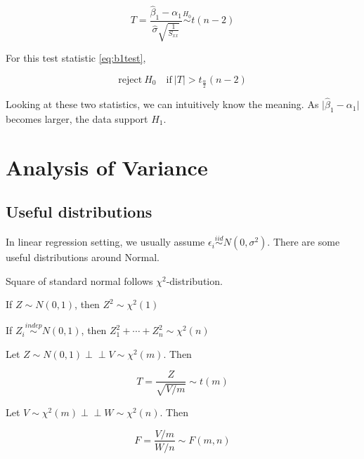 \documentclass[]{book}
\theoremstyle{definition}
\theoremstyle{definition}
\theoremstyle{definition}
\theoremstyle{remark}
\let\BeginKnitrBlock\begin \let\EndKnitrBlock\end
\begin{document}
\begin{equation}
  T = \frac{\hat\beta_1 - \alpha_1}{\hat\sigma \sqrt{\frac{1}{S_{xx}}}} \stackrel{H_0}{\sim} t(n - 2)
  \label{eq:b1test}
\end{equation}

For this test statistic \eqref{eq:b1test},

\[\text{reject}\: H_0 \quad \text{if} \: \lvert T \rvert > t_{\frac{\alpha}{2}}(n - 2)\]

Looking at these two statistics, we can intuitively know the meaning. As \(\lvert \hat\beta_1 - \alpha_1 \rvert\) becomes larger, the data support \(H_1\).

\hypertarget{analysis-of-variance}{%
\section{Analysis of Variance}\label{analysis-of-variance}}

\hypertarget{useful-distributions}{%
\subsection{Useful distributions}\label{useful-distributions}}

In linear regression setting, we usually assume \(\epsilon_i \stackrel{iid}{\sim}N(0, \sigma^2)\). There are some useful distributions around Normal.

\BeginKnitrBlock{proposition}[$\chi^2$-distribution]
\protect\hypertarget{prp:chisq}{}{\label{prp:chisq} {} }Square of standard normal follows \(\chi^2\)-distribution.

If \(Z \sim N(0, 1)\), then \(Z^2 \sim \chi^2(1)\)

If \(Z_i \stackrel{indep}{\sim}N(0, 1)\), then \(Z_1^2 + \cdots + Z_n^2 \sim \chi^2(n)\)
\EndKnitrBlock{proposition}

\BeginKnitrBlock{proposition}[t-distribution]
\protect\hypertarget{prp:tdist}{}{\label{prp:tdist} {} }Let \(Z \sim N(0, 1) \perp\!\!\!\perp V \sim \chi^2(m)\). Then

\[T = \frac{Z}{\sqrt{V / m}} \sim t(m)\]
\EndKnitrBlock{proposition}

\BeginKnitrBlock{proposition}[F-distribution]
\protect\hypertarget{prp:fdist}{}{\label{prp:fdist} {} }Let \(V \sim \chi^2(m) \perp\!\!\!\perp W \sim \chi^2(n)\). Then

\[F = \frac{V / m}{W / n} \sim F(m, n)\]
\EndKnitrBlock{proposition}
\end{document}
